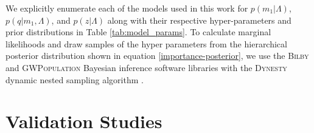 \documentclass[twocolumn, linenumber]{aastex63}
\begin{document}
\noindent
We explicitly enumerate each of the models used in this work for $p(m_1|\Lambda)$, $p(q|m_1, \Lambda)$, and $p(z|\Lambda)$ along with 
their respective hyper-parameters and prior distributions in Table \ref{tab:model_params}. To calculate marginal likelihoods and draw 
samples of the hyper parameters from the hierarchical posterior distribution shown in equation \ref{importance-posterior}, we use the 
\textsc{Bilby} \citep{Ashton_2019, bilby_gwtc1} and \textsc{GWPopulation} \citep{Talbot_2019} Bayesian inference software libraries with 
the \textsc{Dynesty} dynamic nested sampling algorithm \citep{Speagle_2020}.

\section{Validation Studies} \label{sec:validation}
\end{document}
